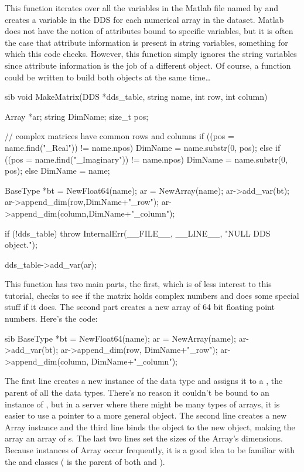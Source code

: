 \documentclass{dods-paper}
\begin{document}
This function iterates over all the variables in the Matlab file named
by  and creates a variable in the DDS for each numerical
array in the dataset. Matlab does not have the notion of attributes
bound to specific variables, but it is often the case that attribute
information is present in string variables, something for which this code checks. However, this function simply ignores the string variables since
attribute information is the job of a different object. Of course, a
function could be written to build both objects at the same time\ldots

\begin{vcode}{sib} 
void 
MakeMatrix(DDS *dds_table, string name, int row, int column)
{
    Array *ar; 
    string DimName;
    size_t pos;
        
    // complex matrices have common rows and columns
    if ((pos = name.find("_Real")) != name.npos)
        DimName = name.substr(0, pos);
    else{
        if ((pos = name.find("_Imaginary")) != name.npos)
            DimName = name.substr(0, pos);
        else
            DimName = name;
    }

    BaseType *bt =  NewFloat64(name);    
    ar = NewArray(name);
    ar->add_var(bt);
    ar->append_dim(row,DimName+"_row");
    ar->append_dim(column,DimName+"_column");
        
    if (!dds_table)
        throw InternalErr(__FILE__, __LINE__, "NULL DDS object.");
   
    dds_table->add_var(ar);
}
\end{vcode}

This function has two main parts, the first, which is of less interest
to this tutorial, checks to see if the matrix holds complex numbers
and does some special stuff if it does. The second part creates a new
array of 64 bit floating point numbers. Here's the code:

  
\begin{vcode}{sib}
   BaseType *bt = NewFloat64(name);   
   ar = NewArray(name);
   ar->add_var(bt);
   ar->append_dim(row, DimName+"_row");
   ar->append_dim(column, DimName+"_column");
\end{vcode}
 

The first line creates a new instance of the  data type and
assigns it to a , the parent of all the data types. There's no
reason it couldn't be bound to an instance of , but in a server
where there might be many types of arrays, it is easier to use a pointer to a
more general object.  The second line creates a new Array instance and the
third line binds the  object to the new  object,
making the array an array of s. The last two lines set the sizes
of the Array's dimensions.  Because instances of Array occur frequently, it
is a good idea to be familiar with the 
and 
classes ( is the parent of both  and ).
\end{document}
